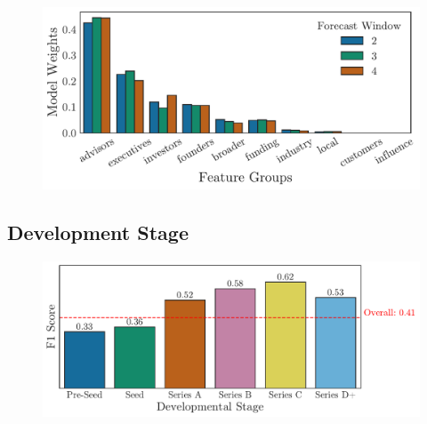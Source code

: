 \documentclass[../thesis/thesis.tex]{subfiles}
\begin{document}
\begin{table}[!htb]
    \centering
    \scalebox{0.9}{}
    \caption[Classification report by forecast window]{}
    \label{fig:evaluation:clf_report_window}
\end{table}

\begin{figure}[!htb]
    \centering
    \includegraphics[width=\textwidth]{../figures/evaluation/feature_groups_window}
    \caption[Grouped feature weights by forecast window]{}
    \label{fig:evaluation:feature_groups_window}
\end{figure}

\subsection{Development Stage}

\begin{figure}[!htb]
    \centering
    \includegraphics[width=\textwidth]{../figures/evaluation/predictive_stage}
    \caption[F1 Scores by developmental stage]{}
    \label{fig:evaluation:f1_predictive_stage}
\end{figure}

\begin{table}[!htb]
    \centering
    \scalebox{0.9}{}
    \caption[Classification report by developmental stage]{}
    \label{fig:evaluation:clf_report_stage}
\end{table}
\end{document}
